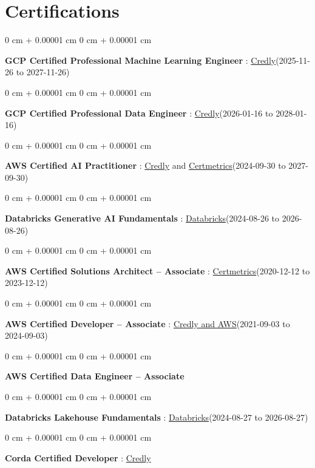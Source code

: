 \documentclass[10pt, letterpaper]{article}
\newenvironment{onecolentry}{
    \begin{adjustwidth}{
        0 cm + 0.00001 cm
    }{
        0 cm + 0.00001 cm
    }
}{
    \end{adjustwidth}
} %
\begin{document}
    \vspace{2 pt }
    \section{Certifications}
        \vspace{2 pt }
        \begin{samepage}
            \begin{onecolentry}
                \textbf{GCP Certified Professional Machine Learning Engineer} : \href{https://www.credly.com/badges/a6965347-09ea-4d8f-b398-0e151407160d/public_url}{Credly}(2025-11-26 to 2027-11-26)
            \end{onecolentry}
            \begin{onecolentry}
                \textbf{GCP Certified Professional Data Engineer} : \href{https://www.credly.com/badges/977e96d9-12e7-4f6c-b8a7-df71fb7153b8/public_url}{Credly}(2026-01-16 to 2028-01-16)
            \end{onecolentry}
            \begin{onecolentry}
                \textbf{AWS Certified AI Practitioner} : \href{https://www.credly.com/badges/451b7ba5-8be1-4a8e-bbec-ade26627a6b6/public_url}{Credly} and \href{https://cp.certmetrics.com/amazon/en/public/verify/credential/495f0d9853874bf9a33c17f8e89ce131}{Certmetrics}(2024-09-30 to 2027-09-30)
            \end{onecolentry}
            \begin{onecolentry}
                \textbf{Databricks Generative AI Fundamentals} : \href{https://sgq.io/3uIFGNi}{Databricks}(2024-08-26 to 2026-08-26)
            \end{onecolentry}
            \begin{onecolentry}
                \textbf{AWS Certified Solutions Architect – Associate} : \href{https://cp.certmetrics.com/amazon/en/public/verify/credential/SNBY48EBJJVE1SWX}{Certmetrics}(2020-12-12 to 2023-12-12)
            \end{onecolentry}
            \begin{onecolentry}
                \textbf{AWS Certified Developer – Associate} : \href{https://www.credly.com/badges/b8106fbd-d3d1-4204-8cdf-e708798fd582/public_url}{Credly and AWS}(2021-09-03  to 2024-09-03)
            \end{onecolentry}
            \begin{onecolentry}
                \textbf{AWS Certified Data Engineer – Associate}
            \end{onecolentry}
            \begin{onecolentry}
                \textbf{Databricks Lakehouse Fundamentals} : \href{https://scl.io/FXGKS0u}{Databricks}(2024-08-27 to 2026-08-27)
            \end{onecolentry}
            \begin{onecolentry}
                \textbf{Corda Certified Developer} : \href{https://www.credly.com/badges/7f29d39c-34b6-4de9-b07d-e10f1090a335/linked_in_profile}{Credly}
            \end{onecolentry}
        \end{samepage}
\end{document}
